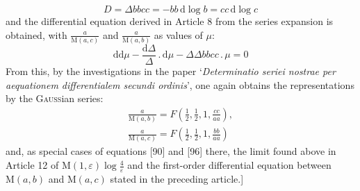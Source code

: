 \[
D=\Delta bbcc=-bb\,\mathrm d\log b=cc\,\mathrm d\log c
\]
and the differential equation derived in Article 8 from the series expansion is obtained, with
$\frac{a}{\mathrm M(a,c)}$ and $\frac{a}{\mathrm M(a,b)}$ as values of $\mu$:
\[
\mathrm{dd}\mu-\frac{\mathrm d\Delta}{\Delta}\mathbin{.}\mathrm d\mu
-\Delta\Delta bbcc\mathbin{.}\mu=0
\]
From this, by the investigations in the paper
`\textit{Determinatio seriei nostrae per aequationem differentialem secundi ordinis}',
one again obtains the representations by the \textsc{Gauss}ian series:
\[
\begin{gathered}\frac{a}{\mathrm M(a,b)}=F\left(\frac12,\frac12,1,\frac{cc}{aa}\right),\\[7pt]
\frac{a}{\mathrm M(a,c)}=F\left(\frac12,\frac12,1,\frac{bb}{aa}\right)\end{gathered}
\]
and, as special cases of equations [90] and [96] there, the limit found above in Article 12 of $\mathrm M(1,\varepsilon)\log\frac{4}{\varepsilon}$ and the first-order differential equation between
$\mathrm M(a,b)$ and $\mathrm M(a,c)$ stated in the preceding article.]

\clearpage
\endgroup
